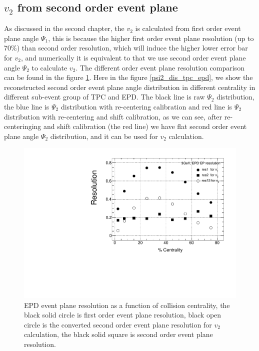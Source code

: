 \subsection{$v_{2}$ from second order event plane}
As discussed in the second chapter, the $v_{2}$ is calculated from first order event plane angle $\Psi_{1}$, this is because the higher first order event plane resolution (up to 70\%) than second order resolution, which will induce the higher lower error bar for $v_{2}$, and numerically it is equivalent to that we use second order event plane angle $\Psi_{2}$ to calculate $v_{2}$. The different order event plane resolution comparison can be found in the figure \ref{res2_tpc_epd}.
Here in the figure \ref{psi2_dis_tpc_epd}, we show the reconstructed second order event plane angle distribution in different centrality in different sub-event group of TPC and EPD. The black line is raw $\Psi_{2}$ distribution, the blue line is $\Psi_{2}$ distribution with re-centering calibration and red line is $\Psi_{2}$ distribution with re-centering and shift calibration,  as we can see, after re-centeringing and shift calibration (the red line) we have flat second order event plane angle $\Psi_{2}$ distribution, and it can be used for $v_{2}$ calculation. 

\begin{figure}[h]
\includegraphics[scale=0.6]{chapter3/fig/second/res_3gev_com.pdf}
\caption{\label{res2_tpc_epd} EPD event plane resolution as a function of collision centrality, the black solid circle is first order event plane resolution, black open circle is the converted second order event plane resolution for $v_{2}$ calculation, the black solid square is second order event plane resolution.}
\end{figure}


